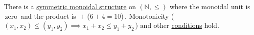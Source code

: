 There is a \href{doc/1 math/Seven Sketches in Compositionality/Chapter 2: Resource theories/2 Symmetric monoidal preorders/1 Definition and first examples/1 Symmetric monoidal structure on a preorder}{symmetric monoidal structure} on $(\mathbb{N}, \leq)$ where the monoidal unit is \,zero\, and the product is \,$+$ ($6+4=10$)\,. Monotonicity (\,$(x_1,x_2)\leq(y_1,y_2) \implies x_1+x_2 \leq y_1+y_2$\,) and other \href{doc/1 math/Seven Sketches in Compositionality/Chapter 2: Resource theories/2 Symmetric monoidal preorders/1 Definition and first examples/1 Symmetric monoidal structure on a preorder}{conditions} hold.
